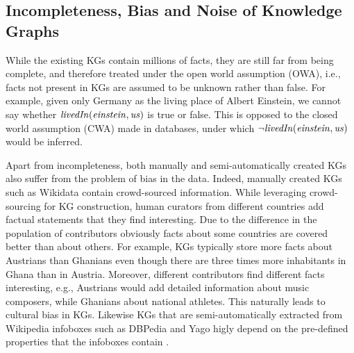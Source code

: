 \subsection{Incompleteness, Bias and Noise of Knowledge Graphs}
\label{sec:kg_realm}
While the existing KGs contain millions of facts, they are still far from being complete, and therefore treated under the open world assumption (OWA), i.e., facts not present in KGs are assumed to be unknown rather than false. For example, given only Germany as the living place of Albert Einstein,  we cannot say whether $\mathit{livedIn(einstein,us)}$ is true or false. This is opposed to the closed world assumption (CWA) made in databases, under which $\mathit{\neg livedIn(einstein,us)}$ would be inferred. %

Apart from incompleteness, both manually and semi-automatically created KGs also suffer from the problem of bias in the data. Indeed,  manually created KGs such as Wikidata contain crowd-sourced information. While leveraging crowd-sourcing for KG construction, human curators from different countries add factual statements that they find interesting. Due to the difference in the population of contributors obviously facts about some countries are covered better than about others. For example, KGs typically store more facts about Austrians than Ghanians even though there are three times more inhabitants in Ghana than in Austria.
Moreover, different contributors find different facts interesting, e.g., Austrians would add detailed information about music composers, while Ghanians about national athletes.  This naturally leads to cultural bias in KGs. Likewise KGs that are semi-automatically extracted from Wikipedia infoboxes such as DBPedia and Yago higly depend on the pre-defined properties that the infoboxes contain \cite{DBLP:conf/www/LajusS18}. %


